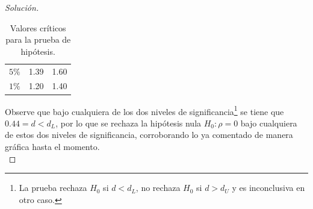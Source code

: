 \documentclass[10.5pt,notitlepage]{article}
\newenvironment{solucion}
  {\begin{proof}[Solución]}
  {\end{proof}}
\theoremstyle{plain}
\begin{document}
\begin{solucion}
\begin{table}[H]
\begin{tabular}{@{}l@{\hskip 0.3in}r@{\hskip 0.3in}r@{}}
            \midrule
            \(5\%\) & 1.39   & 1.60   \\ 
            \(1\%\) & 1.20   & 1.40  \\ 
            \bottomrule
        \end{tabular}
        \caption{Valores críticos para la prueba de hipótesis.}
        \label{tab:Durbin1}
\end{table}
Observe que bajo cualquiera de los dos niveles de significancia\footnote{La prueba rechaza \(H_0\) si \(d < d_{L}\), no rechaza \(H_0\) si \(d > d_{U}\) y es inconclusiva en otro caso.} se tiene que \( 0.44=d < d_{L}\), por lo que se rechaza la hipótesis nula \(H_{0}: \rho = 0\) bajo cualquiera de estos dos niveles de significancia, corroborando lo ya comentado de manera gráfica hasta el momento.\\ 


\end{solucion}
\end{document}
